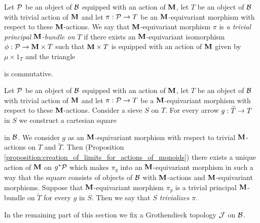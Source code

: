 \begin{definition}
Let ${\mathcal P}$ be an object of ${\mathcal B}$ equipped with an action of $\mathbf{M}$, let $T$ be an object of ${\mathcal B}$ with trivial action of $\mathbf{M}$ and let $\pi:{\mathcal P}\rightarrow T$ be an $\mathbf{M}$-equivariant morphism with respect to these $\mathbf{M}$-actions. We say that $\mathbf{M}$-equivariant morphism $\pi$ is \textit{a trivial principal $\mathbf{M}$-bundle on $T$} if there exists an $\mathbf{M}$-equivariant isomorphism $\phi:{\mathcal P}\rightarrow \mathbf{M}\times T$ such that $\mathbf{M}\times T$ is equipped with an action of $\mathbf{M}$ given by $\mu\times 1_T$ and the triangle
\begin{center}
\end{center}
is commutative.
\end{definition}

\begin{definition}
Let ${\mathcal P}$ be an object of ${\mathcal B}$ equipped with an action of $\mathbf{M}$, let $T$ be an object of ${\mathcal B}$ with trivial action of $\mathbf{M}$ and let $\pi:{\mathcal P}\rightarrow T$ be a $\mathbf{M}$-equivariant morphism with respect to these $\mathbf{M}$-actions. Consider a sieve $S$ on $T$. For every arrow $g:\widetilde{T}\rightarrow T$ in $S$ we construct a cartesian square
\begin{center}
\end{center}
in ${\mathcal B}$. We consider $g$ as an $\mathbf{M}$-equivariant morphism with respect to trivial $\mathbf{M}$-actions on $T$ and $\widetilde{T}$. Then (Proposition \ref{proposition:creation_of_limits_for_actions_of_monoids}) there exists a unique action of $\mathbf{M}$ on $g^*{\mathcal P}$ which makes $\pi_g$ into an $\mathbf{M}$-equivariant morphism in such a way that the square consists of objects of ${\mathcal B}$ with $\mathbf{M}$-actions and $\mathbf{M}$-equivariant morphisms. Suppose that $\mathbf{M}$-equivariant morphism $\pi_g$ is a trivial principal $\mathbf{M}$-bundle on $\widetilde{T}$ for every $g$ in $S$. Then we say that \textit{$S$ trivializes $\pi$}.
\end{definition}
\noindent
In the remaining part of this section we fix a Grothendieck topology ${\mathcal J}$ on ${\mathcal B}$.


